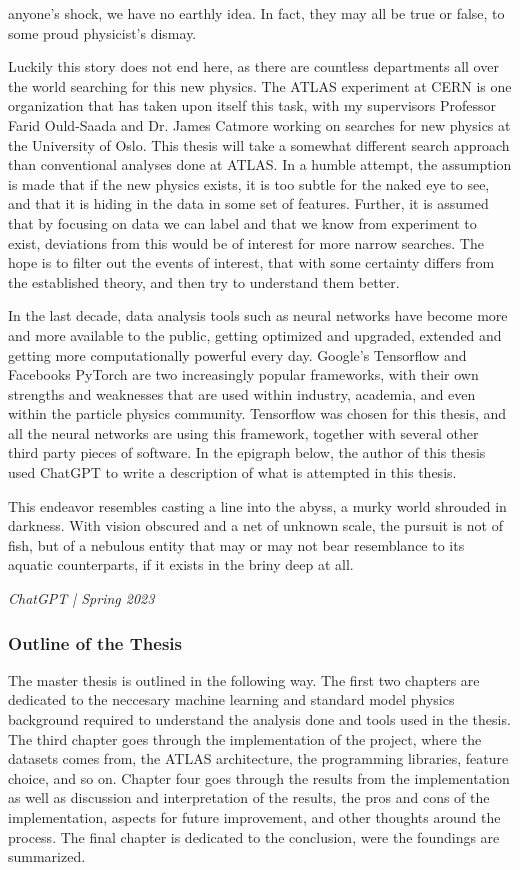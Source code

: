 anyone's shock, we have no earthly idea. In fact, they may all be true or false, to some proud 
physicist's dismay. \par Luckily this story does not end here, as there are countless departments all 
over the world searching for this new physics. The ATLAS experiment at CERN is one organization that 
has taken upon itself this task, with my supervisors Professor Farid Ould-Saada and Dr. James Catmore working 
on searches for new physics at the University of Oslo. This thesis will take a somewhat different search 
approach than conventional analyses done at ATLAS. In a humble attempt, the assumption is made that 
if the new physics exists, it is too subtle for the naked eye to see, and that it is hiding in the data
in some set of features. Further, it is assumed that by focusing on data we can label and that we know 
from experiment to exist, deviations from this would be of interest for more narrow searches. The hope is 
to filter out the events of interest, that with some certainty differs from the established theory, 
and then try to understand them better. \par 
In the last decade, data analysis tools such as neural networks have become more and more available 
to the public, getting optimized and upgraded, extended and getting more computationally powerful every 
day. Google's Tensorflow\cite{tensorflow-whitepaper} and Facebooks PyTorch\cite{paszkepytorch} 
are two increasingly popular frameworks, with their own strengths and weaknesses that are used within industry, 
academia, and even within the particle physics community. Tensorflow was chosen for this thesis, and 
all the neural networks are using this framework, together with several other third party pieces of software. 
In the epigraph below, the author of this thesis used ChatGPT to write a description of what is 
attempted in this thesis. 

\epigraph{
    This endeavor resembles casting a line into the abyss, a murky world 
shrouded in darkness. With vision obscured and a net of unknown scale, 
the pursuit is not of fish, but of a nebulous entity that may or may 
not bear resemblance to its aquatic counterparts, if it exists in 
the briny deep at all.}{\textit{ChatGPT | Spring 2023}}

\par 

\subsubsection*{Outline of the Thesis}
The master thesis is outlined in the following way. The first two chapters are dedicated to the neccesary machine learning and
standard model physics background required to understand the analysis done and tools used in the thesis. The third chapter goes 
through the implementation of the project, where the datasets comes from, the ATLAS architecture, the programming libraries, 
feature choice, and so on. Chapter four goes through the results from the implementation as well as discussion and 
interpretation of the results, the pros and cons of the implementation, aspects for future improvement, and other thoughts around the process.
The final chapter is dedicated to the conclusion, were the foundings are summarized. 


